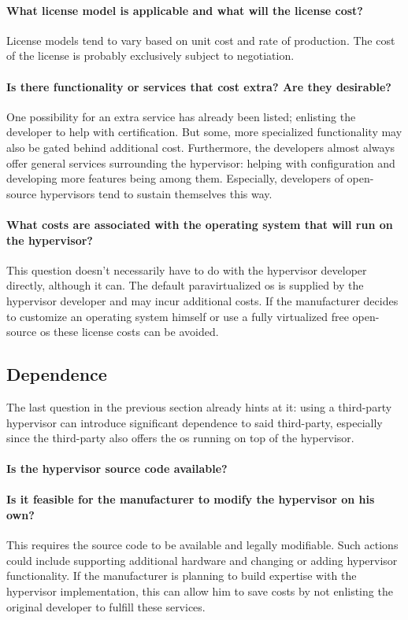 \paragraph{What license model is applicable and what will the license cost?}
License models tend to vary based on unit cost and rate of production.
The cost of the license is probably exclusively subject to negotiation. 
\paragraph{Is there functionality or services that cost extra? Are they desirable?}
One possibility for an extra service has already been listed; enlisting the developer to help with certification. But some, more specialized functionality may also be gated behind additional cost. Furthermore, the developers almost always offer general services surrounding the hypervisor: helping with configuration and developing more features being among them. Especially, developers of open-source hypervisors tend to sustain themselves this way.
\paragraph{What costs are associated with the operating system that will run on the hypervisor?}
This question doesn't necessarily have to do with the hypervisor developer directly, although it can. The default paravirtualized \acrshort{os} is supplied by the hypervisor developer and may incur additional costs. If the manufacturer decides to customize an operating system himself or use a fully virtualized free open-source \acrshort{os} these license costs can be avoided. 
\subsection{Dependence}
The last question in the previous section already hints at it: using a third-party hypervisor can introduce significant dependence to said third-party, especially since the third-party also offers the \acrshort{os} running on top of the hypervisor.
\paragraph{Is the hypervisor source code available?}
\paragraph{Is it feasible for the manufacturer to modify the hypervisor on his own?}
This requires the source code to be available and legally modifiable. Such actions could include supporting additional hardware and changing or adding hypervisor functionality. If the manufacturer is planning to build expertise with the hypervisor implementation, this can allow him to save costs by not enlisting the original developer to fulfill these services.

